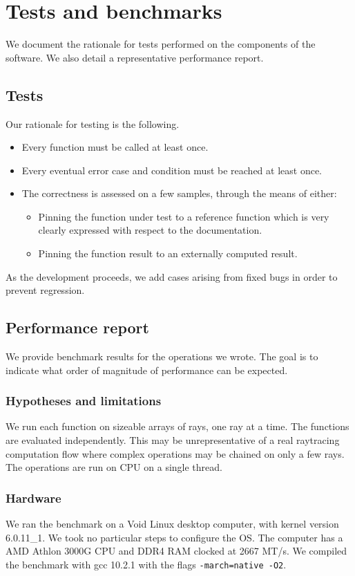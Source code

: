 \section{Tests and benchmarks}
We document the rationale for tests performed on the components of the
software. We also detail a representative performance report.

\subsection{Tests}
Our rationale for testing is the following.

\begin{itemize}
\item Every function must be called at least once.
\item Every eventual error case and condition must be reached at least once.
\item The correctness is assessed on a few samples, through the means of
      either:
  \begin{itemize}
  \item Pinning the function under test to a reference function which
        is very clearly expressed with respect to the documentation.
  \item Pinning the function result to an externally computed result.
  \end{itemize}
\end{itemize}

As the development proceeds, we add cases arising from fixed bugs in order to
prevent regression.

\subsection{Performance report}
We provide benchmark results for the operations we wrote. The goal is
to indicate what order of magnitude of performance can be expected.

\subsubsection{Hypotheses and limitations}
We run each function on sizeable arrays of rays, one ray at a time.
The functions are evaluated independently. This may be unrepresentative of
a real raytracing computation flow where complex operations may be chained
on only a few rays. The operations are run on CPU on a single thread.

\subsubsection{Hardware}
We ran the benchmark on a Void Linux desktop computer, with kernel version
6.0.11\_1. We took no particular steps to configure the OS. The computer
has a AMD Athlon 3000G CPU and DDR4 RAM clocked at 2667 MT/s. We compiled
the benchmark with gcc 10.2.1 with the flags \lstinline{-march=native -O2}.


